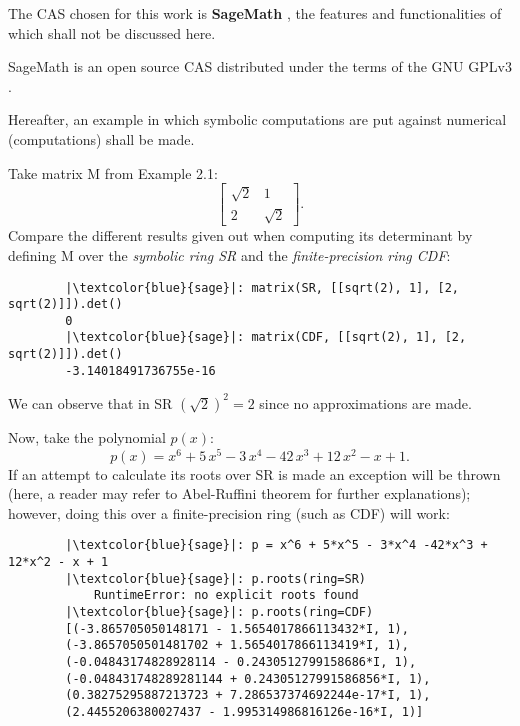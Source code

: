 The CAS chosen for this work is \textbf{SageMath} \cite{sage}, the features and functionalities of which shall not
be discussed here.

SageMath is an open source CAS distributed under the terms of the GNU GPLv3 \cite{gpl}.

Hereafter, an example in which symbolic computations are put against numerical (computations) shall be made.
\begin{example}
    Take matrix M from Example 2.1:
    \[
        \begin{bmatrix}
            \sqrt{2}  &   1    \\
                2     & \sqrt{2}
        \end{bmatrix}.
    \]
    Compare the different results given out when computing its determinant by defining M over the \textit{symbolic ring SR} and
    the \textit{finite-precision ring CDF}:
    \begin{verbatim}
        |\textcolor{blue}{sage}|: matrix(SR, [[sqrt(2), 1], [2, sqrt(2)]]).det()
        0
        |\textcolor{blue}{sage}|: matrix(CDF, [[sqrt(2), 1], [2, sqrt(2)]]).det()
        -3.14018491736755e-16
    \end{verbatim}
    We can observe that in SR \((\sqrt{2})^2 = 2\) since no approximations are made.

    Now, take the polynomial \(p(x)\):
    \[
        p(x) = x^{6} + 5 \, x^{5} - 3 \, x^{4} - 42 \, x^{3} + 12 \, x^{2} - x + 1.
    \]
    If an attempt to calculate its roots over SR is made an exception will be thrown (here, a reader may refer to
    Abel-Ruffini theorem for further explanations); however, doing this over a finite-precision ring (such as CDF) will work:
    \begin{verbatim}
        |\textcolor{blue}{sage}|: p = x^6 + 5*x^5 - 3*x^4 -42*x^3 + 12*x^2 - x + 1
        |\textcolor{blue}{sage}|: p.roots(ring=SR)
            RuntimeError: no explicit roots found
        |\textcolor{blue}{sage}|: p.roots(ring=CDF)
        [(-3.865705050148171 - 1.5654017866113432*I, 1),
        (-3.8657050501481702 + 1.5654017866113419*I, 1),
        (-0.04843174828928114 - 0.2430512799158686*I, 1),
        (-0.048431748289281144 + 0.24305127991586856*I, 1),
        (0.38275295887213723 + 7.286537374692244e-17*I, 1),
        (2.4455206380027437 - 1.995314986816126e-16*I, 1)]
    \end{verbatim}
\end{example}

